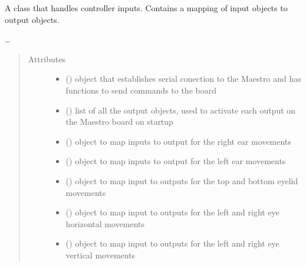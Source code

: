 \documentclass[letterpaper,10pt,english]{sphinxmanual}
\begin{document}
\begin{fulllineitems}
\label{\detokenize{movementmap:MovementMap.MovementMap}}
\sphinxAtStartPar
A class that handles controller inputs. Contains a mapping of input objects to output objects.

\sphinxAtStartPar
…
\begin{quote}\begin{description}
\item[{Attributes}] \leavevmode\begin{itemize}
\item {} 
\sphinxAtStartPar
{}() \textendash{} object that establishes serial conection to the Maestro and has functions to send commands to the board

\item {} 
\sphinxAtStartPar
{}(\sphinxstyleemphasis{{[}OutputObject{]}}) \textendash{} list of all the output objects, used to activate each output on the Maestro board on startup

\item {} 
\sphinxAtStartPar
{}() \textendash{} object to map inputs to output for the right ear movements

\item {} 
\sphinxAtStartPar
{}() \textendash{} object to map inputs to output for the left ear movements

\item {} 
\sphinxAtStartPar
{}() \textendash{} object to map input to outputs for the top and bottom eyelid movements

\item {} 
\sphinxAtStartPar
{}() \textendash{} object to map input to outputs for the left and right eye horizontal movements

\item {} 
\sphinxAtStartPar
{}() \textendash{} object to map input to outputs for the left and right eye vertical movements


\end{itemize}
\end{description}
\end{quote}
\end{fulllineitems}
\end{document}

